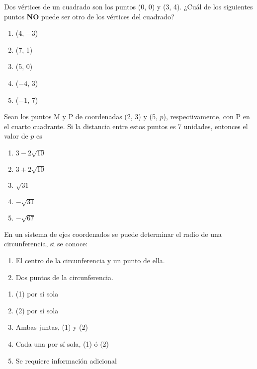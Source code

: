 \begin{enumerate}[label=\large{\textbf{\arabic*.}}, itemsep = 0.15cm, topsep = 0.5cm]
	\parbox{1\linewidth}{ \item Dos vértices de un cuadrado son los puntos (0, 0) y (3, 4). ¿Cuál de los siguientes puntos \textbf{NO} puede ser otro de los vértices del cuadrado? 
		\begin{enumerate}[label={\Alph*)}, itemsep = 0.15cm, topsep = 0.5cm]
			\item (4, $-3$)
			\item (7, 1)
			\item (5, 0)
			\item ($-4$, 3)
			\item ($-1$, 7)
	\end{enumerate}}
	
	\parbox{1\linewidth}{ \item Sean los puntos M y P de coordenadas (2, 3) y (5, $p$), respectivamente, con P en el cuarto cuadrante. Si la distancia entre estos puntos es 7 unidades, entonces el valor de $p$ es 
		\begin{enumerate}[label={\Alph*)}, itemsep = 0.15cm, topsep = 0.5cm]
			\item $3-2\sqrt{10}$
			\item $3+2\sqrt{10}$
			\item $\sqrt{31}$
			\item $-\sqrt{31}$
			\item $-\sqrt{67}$
	\end{enumerate}}
	
	
	
	\parbox{1\linewidth}{\item En un sistema de ejes coordenados se puede determinar el radio de una circunferencia, si se conoce: 
		
		\begin{enumerate}[label={(\arabic*)}, leftmargin = 3cm, topsep = 0.5cm]
			\item El centro de la circunferencia y un punto de ella.
			\item Dos puntos de la circunferencia.
		\end{enumerate}
		\begin{enumerate}[label={\Alph*)}, itemsep = 0.15cm, topsep = 0.5cm]
			\item (1) por sí sola
			\item (2) por sí sola
			\item Ambas juntas, (1) y (2)
			\item Cada una por sí sola, (1) ó (2)
			\item Se requiere información adicional
	\end{enumerate}}
	

\end{enumerate}
